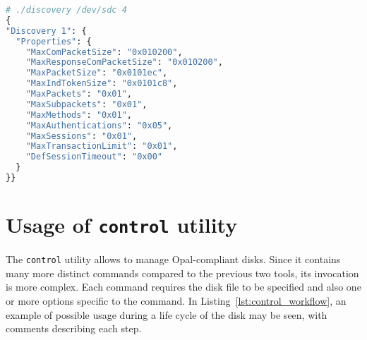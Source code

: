 \begin{lstlisting}[language=python,caption=Execution limited to Level 1 Discovery information,label={lst:discovery_some}]
# ./discovery /dev/sdc 4
{
"Discovery 1": {
  "Properties": {
    "MaxComPacketSize": "0x010200",
    "MaxResponseComPacketSize": "0x010200",
    "MaxPacketSize": "0x0101ec",
    "MaxIndTokenSize": "0x0101c8",
    "MaxPackets": "0x01",
    "MaxSubpackets": "0x01",
    "MaxMethods": "0x01",
    "MaxAuthentications": "0x05",
    "MaxSessions": "0x01",
    "MaxTransactionLimit": "0x01",
    "DefSessionTimeout": "0x00"
  }
}}

\end{lstlisting}


\section{Usage of \texttt{control} utility}

The \verb|control| utility allows to manage Opal-compliant disks. Since it contains many more distinct commands compared to the previous two tools, its invocation is more complex. 
Each command requires the disk file to be specified and also one or more options specific to the command. In Listing~\ref{lst:control_workflow}, an example of possible usage during a life cycle of the disk may be seen, with comments describing each step.







